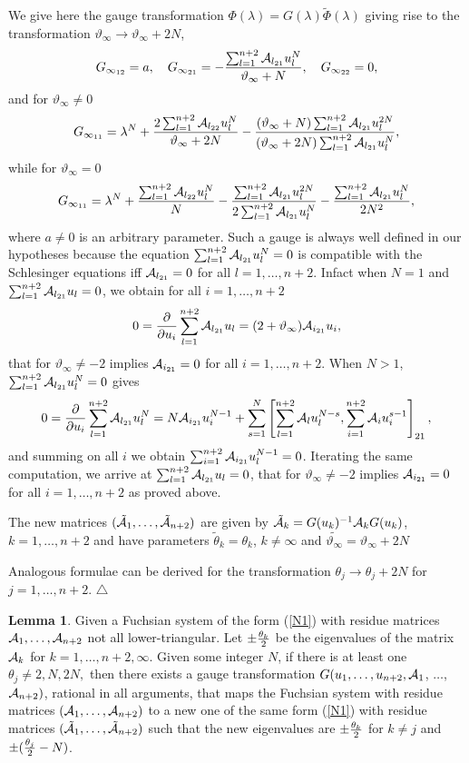 \documentclass[12pt]{article}
\def\thi{{\vartheta_\infty}}
\theoremstyle{definition}
\theoremstyle{theorem}
\newtheorem{lm}[df]{Lemma}
\begin{document}
 We give here the gauge transformation
$\Phi(\lambda)= G(\lambda)\tilde\Phi(\lambda)$ giving rise to the 
transformation $\thi\to\thi+2N$, 
$$
G_{\infty_{12}}= a,
\quad
G_{\infty_{21}}=-{\sum_{l=1}^{n+2}{\cal A}_{l_{21}}u_l^N\over\thi+N},
\quad G_{\infty_{22}}=0,
$$
and for $\thi\neq 0$
$$
G_{\infty_{11}}= \lambda^N+
{2\sum_{l=1}^{n+2}{\cal A}_{l_{22}}u_l^N\over\thi+2N}-
{(\thi+N)\sum_{l=1}^{n+2}{\cal A}_{l_{21}}u_l^{2N}\over
(\thi+2N)\sum_{l=1}^{n+2}{\cal A}_{l_{21}}u_l^N},
$$
while for $\thi=0$
$$
G_{\infty_{11}}= \lambda^N+
{\sum_{l=1}^{n+2}{\cal A}_{l_{22}}u_l^N\over N}-
{\sum_{l=1}^{n+2}{\cal A}_{l_{21}}u_l^{2N}\over
2\sum_{l=1}^{n+2}{\cal A}_{l_{21}}u_l^N}-
{\sum_{l=1}^{n+2}{\cal A}_{l_{21}}u_l^N\over 2 N^2},
$$
where $a\neq 0$ is an arbitrary parameter.
Such a gauge is always well defined in our hypotheses because
the equation $\sum_{l=1}^{n+2}{\cal A}_{l_{21}}u_l^N=0$ is
compatible with the Schlesinger equations iff 
${\cal A}_{l_{21}}=0$ for all $l=1,\dots,n+2$. 
Infact when $N=1$ and $\sum_{l=1}^{n+2}{\cal A}_{l_{21}}u_l=0$, we
obtain for all $i=1,\dots,n+2$
$$
0={\partial\over\partial u_i}\sum_{l=1}^{n+2}{\cal A}_{l_{21}}u_l=
(2+\thi) {\cal A}_{i_{21}} u_i,
$$
that for $\thi\neq-2$ implies ${\cal A}_{i_{21}}=0$ for all 
$i=1,\dots,n+2$. When $N>1$, $\sum_{l=1}^{n+2}{\cal A}_{l_{21}}u_l^N=0$
gives 
$$
0={\partial\over\partial u_i}\sum_{l=1}^{n+2}{\cal A}_{l_{21}}u_l^N=
N {\cal A}_{i_{21}} u_i^{N-1} + \sum_{s=1}^N \left[ 
\sum_{l=1}^{n+2}{\cal A}_{l}u_l^{N-s},\sum_{i=1}^{n+2} 
{\cal A}_{i} u_i^{s-1}\right]_{21},
$$
and summing on all $i$ we obtain 
$\sum_{i=1}^{n+2}{\cal A}_{i_{21}}u_l^{N-1}=0$. Iterating the same 
computation, we arrive at  $\sum_{l=1}^{n+2}{\cal A}_{l_{21}}u_l=0$,
that for $\thi\neq-2$ implies ${\cal A}_{i_{21}}=0$ for all 
$i=1,\dots,n+2$ as proved above.

The new matrices
$(\tilde{\cal A}_1,\dots,\tilde{\cal A}_{n+2})$ are given by
$\tilde{\cal A}_k=G(u_k)^{-1}{\cal A}_kG(u_k)$, $k=1,\dots,n+2$
and have parameters $\tilde\theta_k=\theta_k$, $k\neq\infty$ and
$\tilde\thi=\thi+2N$

Analogous formulae can be derived for the transformation 
$\theta_j\to\theta_j+2N$ for $j=1,\dots,n+2$. 
{\hfill$\bigtriangleup$}

\begin{lm}
Given a Fuchsian system of the form (\ref{N1}) with residue matrices
${\cal A}_1,\dots,{\cal A}_{n+2}$ not all lower-triangular. 
Let $\pm{\theta_k\over 2}$ be the eigenvalues of the matrix 
${\cal A}_k$ for $k=1,\dots,n+2,\infty$. 
Given some integer $N$, if there is at least one $\theta_j\neq 2, N, 2N,$
then there exists a gauge transformation 
$G(u_1,\dots,u_{n+2},{\cal A}_1$, $\dots$, ${\cal A}_{n+2})$, rational 
in all arguments, that maps the Fuchsian system with residue matrices
$({\cal A}_1,\dots,{\cal A}_{n+2})$ to a new one of the same form 
(\ref{N1}) with residue matrices 
$(\tilde{\cal A}_1,\dots,\tilde{\cal A}_{n+2})$
such that the new eigenvalues are $\pm{\theta_k\over 2}$ for $k\neq j$ 
and $\pm({\theta_j\over 2}-N)$. 
\label{lmb0.0}\end{lm}
\end{document}
